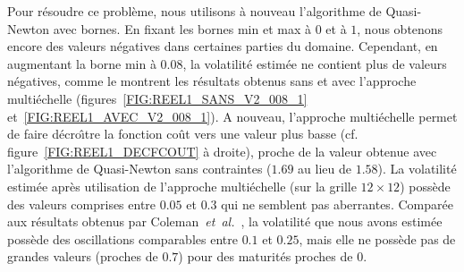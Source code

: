Pour r\'esoudre ce probl\`eme, nous utilisons \`a nouveau 
l'algorithme de Quasi-Newton avec bornes. En fixant les 
bornes min et max \`a $0$ et \`a $1$, nous obtenons encore des 
valeurs n\'egatives dans certaines parties du domaine. Cependant, 
en augmentant la borne min \`a $0.08$, la volatilit\'e estim\'ee 
ne contient plus de valeurs n\'egatives, comme le montrent les 
r\'esultats obtenus sans et avec l'approche multi\'echelle 
(figures~\ref{FIG:REEL1_SANS_V2_008_1} 
et~\ref{FIG:REEL1_AVEC_V2_008_1}). A nouveau, l'approche 
multi\'echelle permet de faire d\'ecro\^{\i}tre la fonction 
co\^ut vers une valeur plus basse (cf. 
figure~\ref{FIG:REEL1_DECFCOUT} \`a droite), proche de la valeur 
obtenue avec l'algorithme de Quasi-Newton sans contraintes ($1.69$ 
au lieu de $1.58$). La volatilit\'e estim\'ee apr\`es utilisation 
de l'approche multi\'echelle (sur la grille $12 \times 12$) 
poss\`ede des valeurs comprises entre $0.05$ et $0.3$ qui 
ne semblent pas aberrantes. Compar\'ee aux r\'esultats obtenus par 
Coleman~{\em et~al.}~\cite{col:jcf:99}, la volatilit\'e que nous 
avons estim\'ee poss\`ede des oscillations comparables entre $0.1$ et 
$0.25$, mais elle ne poss\`ede pas de grandes valeurs (proches 
de $0.7$) pour des maturit\'es proches de $0$.

\pagebreak

